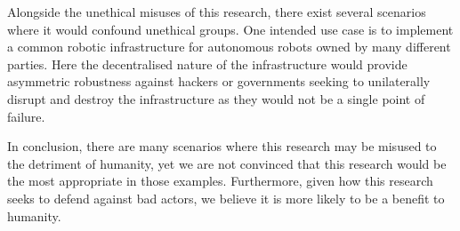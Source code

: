 Alongside the unethical misuses of this research, there exist several scenarios where it would confound unethical groups. One intended use case is to implement a common robotic infrastructure for autonomous robots owned by many different parties. Here the decentralised nature of the infrastructure would provide asymmetric robustness against hackers or governments seeking to unilaterally disrupt and destroy the infrastructure as they would not be a single point of failure.

In conclusion, there are many scenarios where this research may be misused to the detriment of humanity, yet we are not convinced that this research would be the most appropriate in those examples. Furthermore, given how this research seeks to defend against bad actors, we believe it is more likely to be a benefit to humanity.